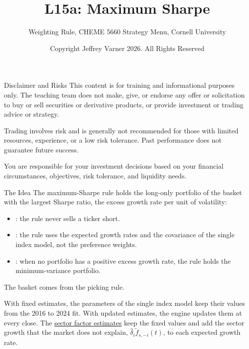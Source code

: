 \documentclass[aspectratio=169,11pt]{beamer}
\title{\texorpdfstring{{\vnheavy L15a}}{L15a}: Maximum Sharpe}
\subtitle{Weighting Rule, CHEME 5660 Strategy Menu, Cornell University}
\author{Copyright Jeffrey Varner 2026. All Rights Reserved}
\newcommand{\repo}{https://github.com/varnerlab/CHEME-5660-CourseRepository-Fall-2026/blob/main/lectures/week-15/L15a}
\begin{document}
\vntitlepage

\begin{frame}{Disclaimer and Risks}
  \vspace{0.6em}
  \textbf{} This content is for training and informational
  purposes only. The teaching team does not make, give, or endorse any offer or
  solicitation to buy or sell securities or derivative products, or provide
  investment or trading advice or strategy.

  \vspace{1.1em}
  \textbf{} Trading involves risk and is generally not recommended for
  those with limited resources, experience, or a low risk tolerance. Past
  performance does not guarantee future success.

  \vspace{1.1em}
  \textbf{} You are responsible for your investment decisions
  based on your financial circumstances, objectives, risk tolerance, and
  liquidity needs.
\end{frame}

\begin{frame}{The Idea}
  \vspace{0.3em}
  The maximum-Sharpe rule holds the long-only portfolio of the basket with the largest Sharpe ratio, the
  excess growth rate per unit of volatility:
  \begin{itemize}\setlength{\itemsep}{0.5em}
    \item {}: the rule never sells a ticker short.
    \item {}: the rule uses the expected growth rates and the covariance of the single index model, not the preference weights.
    \item {}: when no portfolio has a positive excess growth rate, the rule holds the minimum-variance portfolio.
  \end{itemize}

  \vspace{0.5em}
  The basket comes from the picking rule.

  \vspace{0.5em}
  With fixed estimates, the parameters of the single index model keep their values from the 2016 to 2024 fit.
  With updated estimates, the engine updates them at every close. The \href{\repo/strategies/slides/CHEME-5660-L15a-Strategy-Sector-Factor-Fall-2026.pdf}{sector factor estimates}
  keep the fixed values and add the sector growth that the market does not explain, $\hat{\delta}_{i}\tilde{f}_{s,-i}(t)$, to each expected growth rate.
\end{frame}
\end{document}

